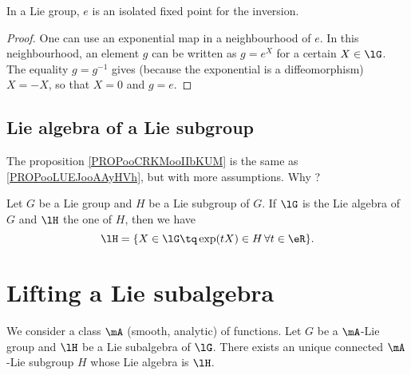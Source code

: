 \begin{lemma}
	In a Lie group, $e$ is an isolated fixed point for the inversion.
\end{lemma}

\begin{proof}
	One can use an exponential map in a neighbourhood of $e$. In this neighbourhood, an element $g$ can be written as $g=e^X$ for a certain $X\in\lG$. The equality $g=g^{-1}$ gives (because the exponential is a diffeomorphism) $X=-X$, so that $X=0$ and $g=e$.
\end{proof}

\subsection{Lie algebra of a Lie subgroup}

\begin{probleme}
	The proposition \ref{PROPooCRKMooIIbKUM} is the same as \ref{PROPooLUEJooAAyHVh}, but with more assumptions. Why ?
\end{probleme}

\begin{proposition}       \label{PROPooLUEJooAAyHVh}
	Let \( G\) be a Lie group and \( H\) be a Lie subgroup of \( G\). If \( \lG\) is the Lie algebra of \( G\) and \( \lH\) the one of \( H\), then we have
	\begin{equation}
		\lH=\{ X\in \lG\tq \exp(tX)\in H\,\forall t\in \eR \}.
	\end{equation}
\end{proposition}

\section{Lifting a Lie subalgebra}

\begin{theorem}       \label{THOooXALIooGiPVdD}
	We consider a class \( \mA\) (smooth, analytic) of functions. Let \( G\) be a \( \mA\)-Lie group and \( \lH\) be a Lie subalgebra of \( \lG\). There exists an unique connected \( \mA\)-Lie subgroup \( H\) whose Lie algebra is \( \lH\).
\end{theorem}

